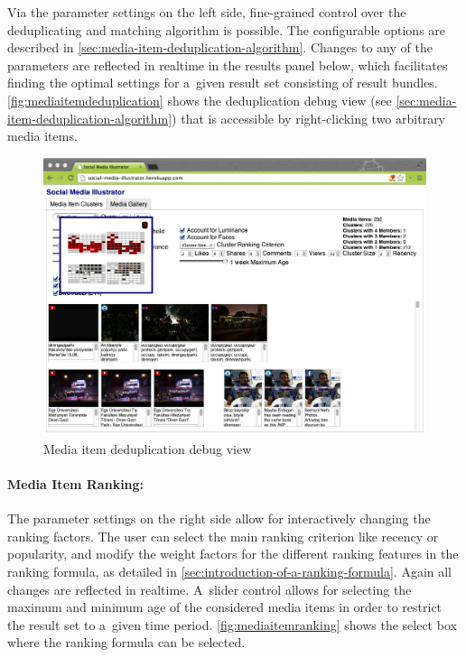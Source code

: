 Via the parameter settings on the left side,
fine-grained control over the deduplicating
and matching algorithm is possible.
The configurable options are described in \autoref{sec:media-item-deduplication-algorithm}.
Changes to any of the parameters are reflected in realtime
in the results panel below, which facilitates finding the optimal
settings for a~given result set consisting of result bundles.
\autoref{fig:mediaitemdeduplication} shows the deduplication debug view (see \autoref{sec:media-item-deduplication-algorithm})
that is accessible by right-clicking two arbitrary media items.

\begin{figure}[!ht]
  \centering
  \includegraphics[width=1\columnwidth]{app2.png}
  \caption{Media item deduplication debug view}
  \label{fig:mediaitemdeduplication}
\end{figure}

\paragraph{Media Item Ranking:}

The parameter settings on the right side
allow for interactively changing the ranking factors.
The user can select the main ranking criterion like recency or popularity, and modify the weight factors
for the different ranking features in the ranking formula,
as detailed in \autoref{sec:introduction-of-a-ranking-formula}.
Again all changes are reflected in realtime.
A~slider control allows for selecting the maximum
and minimum age of the considered media items
in order to restrict the result set to a~given time period.
\autoref{fig:mediaitemranking} shows the select box
where the ranking formula can be selected.


